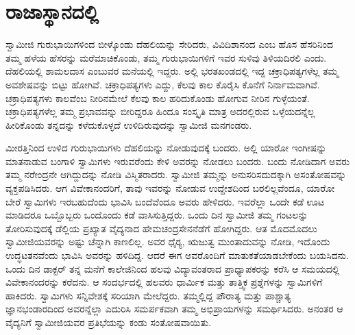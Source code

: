 
\chapter{ರಾಜಾಸ್ಥಾನದಲ್ಲಿ}

ಸ್ವಾಮೀಜಿ ಗುರುಭಾಯಿಗಳಿಂದ ಬೀಳ್ಕೊಂಡು ದೆಹಲಿಯನ್ನು ಸೇರಿದರು, ವಿವಿದಿಶಾನಂದ ಎಂಬ ಹೊಸ ಹೆಸರಿನಿಂದ ತಮ್ಮ ಹಳೆಯ ಹೆಸರನ್ನು ಮರೆಮಾಚಿಕೊಂಡು, ತಮ್ಮ ಗುರುಭಾಯಿಗಳಿಗೆ ಇವರ ಸುಳಿವು ತಿಳಿಯದಿರಲಿ ಎಂದು. ದೆಹಲಿಯಲ್ಲಿ ಶಾಮಲದಾಸ ಎಂಬುವರ ಮನೆಯಲ್ಲಿ ಇದ್ದರು. ಅಲ್ಲಿ ಭರತಖಂಡದಲ್ಲಿ ಇದ್ದ ಚಕ್ರಾಧಿಪತ್ಯಗಳೆಲ್ಲ ತಮ್ಮ ಅವಶೇಷವನ್ನು ಬಿಟ್ಟು ಹೋಗಿವೆ. ಚಕ್ರಾಧಿಪತ್ಯಗಳು ಎದ್ದು, ಕೆಲವು ಕಾಲ ಕೊರೈಸಿ ಕೊನೆಗೆ ನಿರ್ನಾಮವಾಗಿವೆ. ಚಕ್ರಾಧಿಪತ್ಯಗಳು ಕಾಲವೆಂಬ ನೀರಿನಮೇಲೆ ಕೆಲವು ಕಾಲ ಹರಿದುಕೊಂಡು ಹೋಗುವ ನೀರಿನ ಗುಳ್ಳೆಯಂತೆ. ಚಕ್ರಾಧಿಪತ್ಯಗಳೆಲ್ಲ ತಮ್ಮ ಪ್ರಭಾವವನ್ನು ಬೀರಿದ್ದರೂ ಹಿಂದೂ ಸಂಸ್ಕೃತಿ ಮಾತ್ರ ಅದರಲ್ಲಿರುವ ಒಳ್ಳೆಯದನ್ನೆಲ್ಲ ಹೀರಿಕೊಂಡು ತನ್ನದನ್ನು ಕಳೆದುಕೊಳ್ಳದೆ ಉಳಿದಿರುವುದನ್ನು ಸ್ವಾಮೀಜಿ ಮನಗಂಡರು. 

ಮೀರತ್ತಿನಿಂದ ಉಳಿದ ಗುರುಭಾಯಿಗಳು ದೆಹಲಿಯನ್ನು ನೋಡುವುದಕ್ಕೆ ಬಂದರು. ಅಲ್ಲಿ ಯಾರೋ ಇಂಗೀಷನ್ನು ಮಾತನಾಡುವ ಬಂಗಾಳಿ ಸ್ವಾಮಿಗಳು ಇರುವರೆಂದು ಕೇಳಿ ಅವರನ್ನು ನೋಡಲು ಬಂದರು. ಬಂದು ನೋಡಿದಾಗ ಅವರು ತಮ್ಮ ನರೇಂದ್ರನೇ ಆಗಿದ್ದುದನ್ನು ನೋಡಿ ವಿಸ್ಮಿತರಾದರು. ಸ್ವಾಮೀಜಿ ತಮ್ಮನ್ನು ಅನುಸರಿಸದುದಕ್ಕಾಗಿ ಅಸಂತೋಷವನ್ನು ವ್ಯಕ್ತಪಡಿಸಿದರು. ಆಗ ವಿವೇಕಾನಂದರಿಗೆ, ತಾವು ಇವರನ್ನು ನೋಡುವ ಉದ್ದೇಶದಿಂದ ಬರಲಿಲ್ಲವೆಂದೂ, ಯಾರೋ ಬೇರೆ ಸ್ವಾಮಿಗಳು ಇರಬಹುದೆಂದು ಭಾವಿಸಿ ಬಂದೆವೆಂದೂ ಅವರು ಹೇಳಿದರು. ಇವರೆಲ್ಲಾ ಒಂದೇ ಕಡೆ ಊಟ ಮಾಡಿದರೂ ಒಬ್ಬೊಬ್ಬರು ಒಂದೊಂದು ಕಡೆ ವಾಸಿಸುತ್ತಿದ್ದರು. ಒಂದು ದಿನ ಸ್ವಾಮೀಜಿ ತಮ್ಮ ಗಂಟಲನ್ನು ತೋರಿಸುವುದಕ್ಕೆ ಡೆಲ್ಲಿಯ ಪ್ರಖ್ಯಾತ ವೈದ್ಯನಾದ ಹೇಮಚಂದ್ರಸೇನನೆಡೆಗೆ ಹೋಗಿದ್ದರು. ಆತ ಮೊದಮೊದಲು ಸ್ವಾಮೀಜಿಯವರನ್ನು ಅಷ್ಟು ಚೆನ್ನಾಗಿ ಕಾಣಲಿಲ್ಲ. ಅವರ ಧೈರ‍್ಯ, ಋಜುತ್ವ ಮುಂತಾದುವನ್ನು ನೋಡಿ, ಇದೊಂದು ಉದ್ಧಟತನವೆಂದು ಭಾವಿಸಿ ಅವರನ್ನು ಹಳಿದಿದ್ದ. ಆದರೆ ಈಗ ಅವರೊಂದಿಗೆ ಮಾತುಕತೆಯಾಡಬೇಕೆಂದು ಬಯಸಿದನು. ಒಂದು ದಿನ ಡಾಕ್ಟರ್ ತನ್ನ ಮನೆಗೆ ಕಾಲೇಜಿನಿಂದ ಹಲವು ವಿದ್ಯಾವಂತರಾದ ಪ್ರಾಧ್ಯಾಪಕರನ್ನು ಕರೆಸಿ ಆ ಸಮಯದಲ್ಲಿ ವಿವೇಕಾನಂದರನ್ನು ಕರೆದನು. ಆ ಸಂದರ್ಭದಲ್ಲಿ ಹಲವರು ಧಾರ್ಮಿಕ ಮತ್ತು ತಾತ್ತ್ವಿಕ ಪ್ರಶ್ನೆಗಳನ್ನು ಸ್ವಾಮಿಗಳಿಗೆ ಹಾಕಿದರು. ಸ್ವಾಮಿಗಳು ಸನ್ನಿವೇಶಕ್ಕೆ ಸರಿಯಾಗಿ ಮೇಲೆದ್ದರು. ತಮ್ಮಲ್ಲಿದ್ದ ಪೌರಾತ್ಯ ಮತ್ತು ಪಾಶ್ಚಾತ್ಯ ಜ್ಞಾನಭಂಡಾರದಿಂದ ಅವರನ್ನೆಲ್ಲಾ ಎದುರಿಸಿ ಸಮರ್ಪಕವಾಗಿ ತಮ್ಮ ಅಭಿಪ್ರಾಯಗಳನ್ನು ಸಮರ್ಥಿಸಿದರು. ಅನಂತರ ಆ ವೈದ್ಯನಿಗೆ ಸ್ವಾಮೀಜಿಯವರ ಪ್ರತಿಭೆಯನ್ನು ಕಂಡು ಸಂತೋಷವಾಯಿತು. 

